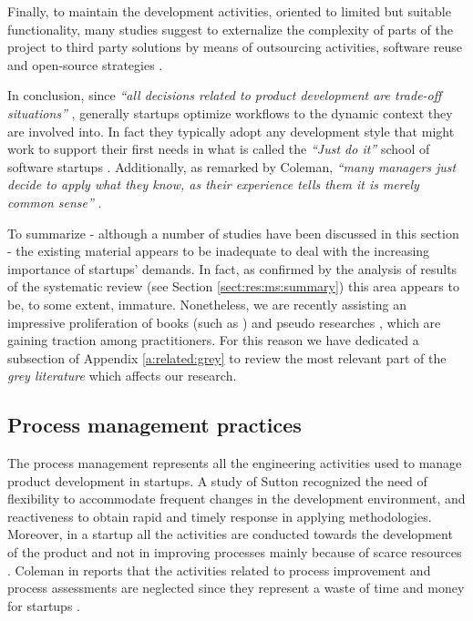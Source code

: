 \documentclass[final,5p,times,twocolumn]{elsarticle}
\begin{document}
Finally, to maintain the development activities, oriented to limited but suitable functionality, many studies suggest to externalize the complexity of parts of the project to third party solutions by means of outsourcing activities, software reuse and open-source strategies \cite{Hanna2010, Jansen2008, Wall2001, Bean2005}.

In conclusion, since \textit{``all decisions related to product development are trade-off situations''} \cite{Hilmola2003}, generally startups optimize workflows to the dynamic context they are involved into. In fact they typically adopt any development style that might work to support their first needs in what is called the \textit{``Just do it''} school of software startups \cite{Ries2011}. Additionally, as remarked by Coleman, \textit{``many managers just decide to apply what they know, as their experience tells them it is merely common sense''} \cite{Coleman2008}.

To summarize - although a number of studies have been discussed in this section - the existing material appears to be inadequate to deal with the increasing importance of startups’ demands. In fact, as confirmed by the analysis of results of the systematic review (see Section  \ref{sect:res:ms:summary}) this area appears to be, to some extent, immature. Nonetheless, we are recently assisting an impressive proliferation of books (such as \cite{Blank2012, Ries2011, Christensen1997, RobWalling2010}) and pseudo researches \cite{StartupGenome}, which are gaining traction among practitioners. For this reason we have dedicated a subsection of Appendix \ref{a:related:grey} to review the most relevant part of the \textit{grey literature} which affects our research.



\subsection{Process management practices}
\label{sub:analysis-process}

The process management represents all the engineering activities used to manage product development in startups.  A study of Sutton  \cite{Sutton2000} recognized the need of flexibility to accommodate frequent changes in the development environment, and reactiveness to obtain rapid and timely response in applying methodologies.  Moreover, in a startup all the activities are conducted towards the development of the product and not in improving processes mainly because of scarce resources \cite{Heitlager2007}. Coleman in \cite{Coleman2008a} reports that the activities related to process improvement and process assessments are neglected since they represent a waste of time and money for startups \cite{Fayad1997, Coleman2008}.  
\end{document}
